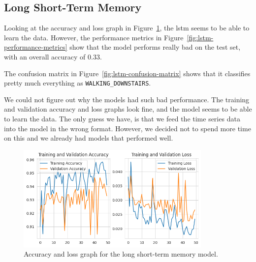 \subsection{Long Short-Term Memory}\label{subsec:long-short-term-memory}

Looking at the accuracy and loss graph in Figure~\ref{fig:lstm-accuracy-loss-graph}, the lstm seems to be able to learn the data.
However, the performance metrics in Figure~\ref{fig:lstm-performance-metrics} show that the model performs really bad on the test set, with an overall accuracy of 0.33.

The confusion matrix in Figure~\ref{fig:lstm-confusion-matrix} shows that it classifies pretty much everything as \texttt{WALKING\_DOWNSTAIRS}.

We could not figure out why the models had such bad performance.
The training and validation accuracy and loss graphs look fine, and the model seems to be able to learn the data.
The only guess we have, is that we feed the time series data into the model in the wrong format.
However, we decided not to spend more time on this and we already had models that performed well.

\begin{figure}[ht]
    \centering
    \includegraphics[width=0.85\textwidth]{./img/lstm/accuracy-loss-graph}
    \caption{Accuracy and loss graph for the long short-term memory model.}
    \label{fig:lstm-accuracy-loss-graph}
\end{figure}

